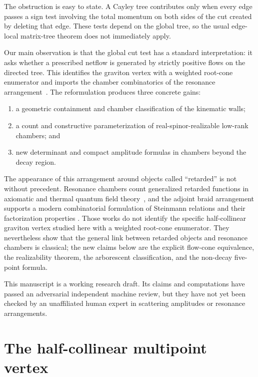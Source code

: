\documentclass[11pt]{article}
\theoremstyle{definition}
\theoremstyle{remark}
\begin{document}
The obstruction is easy to state.  A Cayley tree contributes only when every
edge passes a sign test involving the total momentum on both sides of the cut
created by deleting that edge.  These tests depend on the global tree, so the
usual edge-local matrix-tree theorem does not immediately apply.

Our main observation is that the global cut test has a standard interpretation:
it asks whether a prescribed netflow is generated by strictly positive flows
on the directed tree.  This identifies the graviton vertex with a weighted
root-cone enumerator and imports the chamber combinatorics of the resonance
arrangement~\cite{RootCones}.  The reformulation produces three concrete gains:

\begin{enumerate}[leftmargin=2em]
  \item a geometric containment and chamber classification of the kinematic walls;
  \item a count and constructive parameterization of real-spinor-realizable
        low-rank chambers; and
  \item new determinant and compact amplitude formulas in chambers beyond the
        decay region.
\end{enumerate}

The appearance of this arrangement around objects called ``retarded'' is not
without precedent.  Resonance chambers count generalized retarded functions
in axiomatic and thermal quantum field theory~\cite{Evans,EpsteinTrees}, and
the adjoint braid arrangement supports a modern combinatorial formulation of
Steinmann relations and their factorization properties
\cite{LiuNorledgeOcneanu,NorledgeOcneanu}.  Those works do not identify the
specific half-collinear graviton vertex studied here with a weighted root-cone
enumerator.  They nevertheless show that the general link between retarded
objects and resonance chambers is classical; the new claims below are the
explicit flow-cone equivalence, the realizability theorem, the arborescent
classification, and the non-decay five-point formula.

This manuscript is a working research draft.  Its claims and computations have
passed an adversarial independent machine review, but they have not yet been
checked by an unaffiliated human expert in scattering amplitudes or resonance
arrangements.

\section{The half-collinear multipoint vertex}
\end{document}

